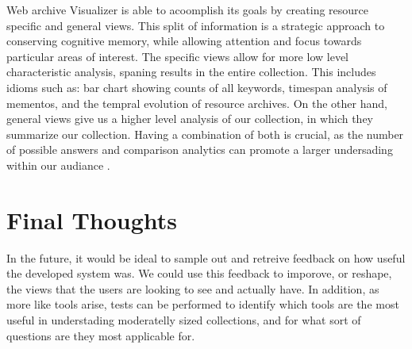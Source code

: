 \documentclass[10pt,journal,compsoc]{IEEEtran}
\begin{document}
Web archive Visualizer is able to acoomplish its goals by creating resource specific and general views. This split of information is a strategic approach to conserving cognitive memory, while allowing attention and focus towards particular areas of interest. The specific views allow for more low level characteristic analysis, spaning results in the entire collection. This includes idioms such as: bar chart showing counts of all keywords, timespan analysis of mementos, and the tempral evolution of resource archives. On the other hand, general views give us a higher level analysis of our collection, in which they summarize our collection. Having a combination of both is crucial, as the number of possible answers and comparison analytics can promote a larger undersading within our audiance . \par

\section{Final Thoughts}

In the future, it would be ideal to sample out and retreive feedback on how useful the developed system was. We could use this feedback to imporove, or reshape, the views that the users are looking to see and actually have. In addition, as more like tools arise, tests can be performed to identify which tools are the most useful in understading moderatelly sized collections, and for what sort of questions are they most applicable for. \par


\ifCLASSOPTIONcaptionsoff
  \newpage
\fi




{}


%
%
\end{document}
